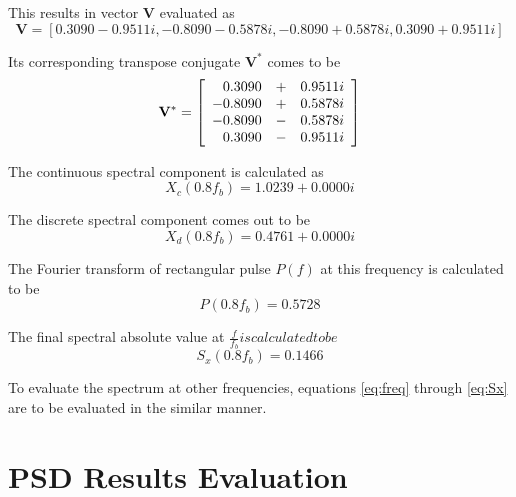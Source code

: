 This results in vector $\mathbf{V}$ evaluated as
\begin{equation}
\mathbf{V}=\left[0.3090-0.9511i, -0.8090-0.5878i, -0.8090+0.5878i, 0.3090+0.9511i \right]
\end{equation}

Its corresponding transpose conjugate $\mathbf{V^*}$ comes to be
\begin{equation}
	\mathbf{V^*}=
		\left[
		\begin{array}{r c l}
   0.3090 &+& 0.9511i \\
  -0.8090 &+& 0.5878i \\
  -0.8090 &-& 0.5878i \\
   0.3090 &-& 0.9511i 
		\end{array}
		\right]
\end{equation}

The continuous spectral component is calculated as
\begin{equation}
	{X_c(0.8f_b)}= 1.0239 + 0.0000i
\end{equation}

The discrete spectral component comes out to be
\begin{equation}
	{X_d(0.8f_b)}= 0.4761 + 0.0000i
\end{equation}

The Fourier transform of rectangular pulse $P(f)$ at this frequency is calculated to be
\begin{equation}
	{P(0.8f_b)}= 0.5728 
\end{equation}

The final spectral absolute value at $\frac{f}{f_b} is calculated to be$
\begin{equation}
	{S_x(0.8 f_b)}= 0.1466
	\label{eq:Sx}
\end{equation}

To evaluate the spectrum at other frequencies, equations \ref{eq:freq} through \ref{eq:Sx} are to be evaluated in the similar manner.

\section {PSD Results Evaluation}

